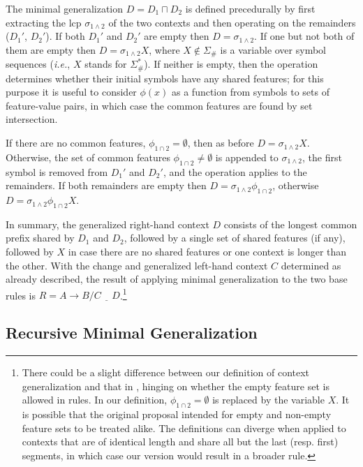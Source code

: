 \documentclass[11pt]{article}
\begin{document}
The minimal generalization $D = D_1 \sqcap D_2$ is defined precedurally by first extracting the lcp $\sigma_{1\land2}$ of the two contexts and then operating on the remainders ($D_1'$, $D_2'$). If both $D_1'$ and $D_2'$ are empty then $D = \sigma_{1\land2}$. If one but not both of them are empty then $D = \sigma_{1\land2}X$, where $X \notin \Sigma_{\#}$ is a variable over symbol sequences (\emph{i.e.}, $X$ stands for $\Sigma_{\#}^*$). If neither is empty, then the operation determines whether their initial symbols have any shared features; for this purpose it is useful to consider $\phi(x)$ as a function from symbols to sets of feature-value pairs, in which case the common features are found by set intersection.

If there are no common features, $\phi_{1\cap2} = \emptyset$, then as before $D = \sigma_{1\land2}X$. Otherwise, the set of common features $\phi_{1\cap2} \neq \emptyset$ is appended to $\sigma_{1\land2}$, the first symbol is removed from $D_1'$ and $D_2'$, and the operation applies to the remainders. If both remainders are empty then $D = \sigma_{1\land2} \phi_{1\cap2}$, otherwise $D = \sigma_{1\land2}\phi_{1\cap2}X$.

In summary, the generalized right-hand context $D$ consists of the longest common prefix shared by $D_1$ and $D_2$, followed by a single set of shared features (if any), followed by $X$ in case there are no shared features or one context is longer than the other. With the change and generalized left-hand context $C$ determined as already described, the result of applying minimal generalization to the two base rules is $R = A \to B / C \ \underline{\ \ \ } \ D$.\footnote{There could be a slight difference between our definition of context generalization and that in \citet{albright2002a}, hinging on whether the empty feature set is allowed in rules. In our definition, $\phi_{1\cap2} = \emptyset$ is replaced by the variable $X$. It is possible that the original proposal intended for empty and non-empty feature sets to be treated alike. The definitions can diverge when applied to contexts that are of identical length and share all but the last (resp. first) segments, in which case our version would result in a broader rule.}

\subsection{Recursive Minimal Generalization}
\end{document}
